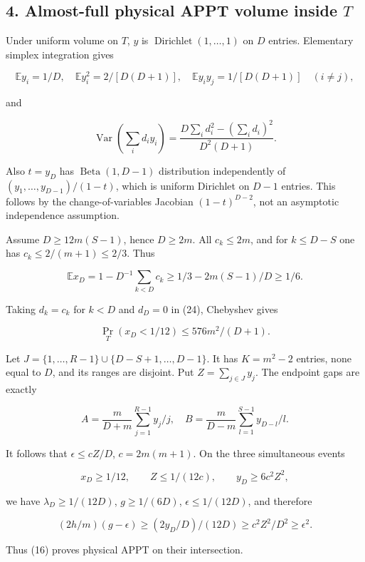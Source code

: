 \documentclass[
  11pt,
]{article}
\begin{document}
\hypertarget{almost-full-physical-appt-volume-inside-t}{%
\subsection{\texorpdfstring{4. Almost-full physical APPT volume inside
\(T\)}{4. Almost-full physical APPT volume inside T}}\label{almost-full-physical-appt-volume-inside-t}}

Under uniform volume on \(T\), \(y\) is
\(\operatorname{Dirichlet}(1,\ldots,1)\) on \(D\) entries. Elementary
simplex integration gives

\[
\mathbb Ey_i=1/D,\quad\mathbb Ey_i^2=2/[D(D+1)],\quad
\mathbb Ey_i y_j=1/[D(D+1)]\quad(i\ne j),
\tag{23}
\]

and

\[
\operatorname{Var}(\sum_i d_i y_i)
=\frac{D\sum_i d_i^2-(\sum_i d_i)^2}{D^2(D+1)}.
\tag{24}
\]

Also \(t=y_D\) has \(\operatorname{Beta}(1,D-1)\) distribution
independently of \((y_1,\ldots,y_{D-1})/(1-t)\), which is uniform
Dirichlet on \(D-1\) entries. This follows by the change-of-variables
Jacobian \((1-t)^{D-2}\), not an asymptotic independence assumption.

Assume \(D\geq12m(S-1)\), hence \(D\geq2m\). All \(c_k\leq2m\), and for
\(k\leq D-S\) one has \(c_k\leq2/(m+1)\leq2/3\). Thus

\[
\mathbb Ex_D=1-D^{-1}\sum_{k<D}c_k\geq1/3-2m(S-1)/D\geq1/6.
\]

Taking \(d_k=c_k\) for \(k<D\) and \(d_D=0\) in (24), Chebyshev gives

\[
\Pr_T(x_D<1/12)\leq576m^2/(D+1).
\tag{25}
\]

Let \(J=\{1,\ldots,R-1\}\cup\{D-S+1,\ldots,D-1\}\). It has \(K=m^2-2\)
entries, none equal to \(D\), and its ranges are disjoint. Put
\(Z=\sum_{j\in J}y_j\). The endpoint gaps are exactly

\[
A=\frac m{D+m}\sum_{j=1}^{R-1}y_j/j,\quad
B=\frac m{D-m}\sum_{l=1}^{S-1}y_{D-l}/l.
\tag{26}
\]

It follows that \(\epsilon\leq cZ/D\), \(c=2m(m+1)\). On the three
simultaneous events

\[
x_D\geq1/12,\qquad Z\leq1/(12c),\qquad y_D\geq6c^2Z^2,
\tag{27}
\]

we have \(\lambda_D\geq1/(12D)\), \(g\geq1/(6D)\),
\(\epsilon\leq1/(12D)\), and therefore

\[
(2h/m)(g-\epsilon)\geq(2y_D/D)/(12D)
\geq c^2Z^2/D^2\geq\epsilon^2.
\]

Thus (16) proves physical APPT on their intersection.
\end{document}
